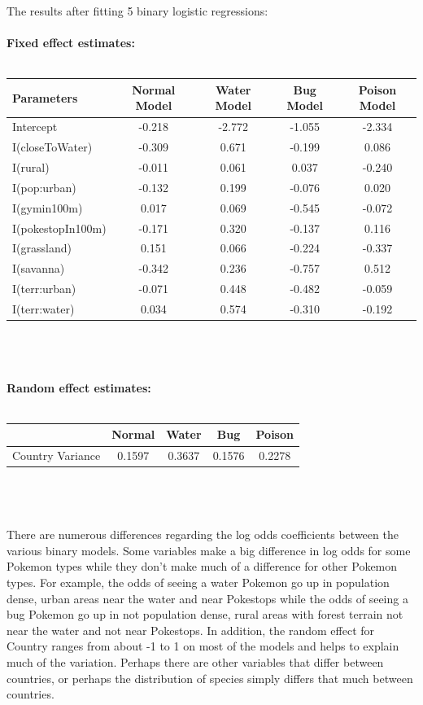 \documentclass{article}
\begin{document}
\noindent The results after fitting 5 binary logistic regressions: \\ 
\\ 
\textbf{Fixed effect estimates:} \\ \\ 
\begin{tabular}{| l | c | c | c | c |}
	\hline
	Parameters & Normal Model & Water Model & Bug Model & Poison Model \\
	\hline 
	Intercept & -0.218 & -2.772 & -1.055 & -2.334 \\ 
	I(closeToWater) & -0.309 & 0.671 & -0.199 & 0.086 \\ 
	I(rural) & -0.011 & 0.061 & 0.037 & -0.240\\ 
	I(pop:urban) & -0.132 & 0.199 & -0.076 & 0.020 \\ 
	I(gymin100m) & 0.017 & 0.069 & -0.545 &  -0.072 \\ 
	I(pokestopIn100m) & -0.171 & 0.320 & -0.137 & 0.116 \\ 
	I(grassland) & 0.151 & 0.066 & -0.224 & -0.337 \\ 
	I(savanna) & -0.342 & 0.236 & -0.757 & 0.512 \\ 
	I(terr:urban) & -0.071 & 0.448 & -0.482 & -0.059  \\ 
	I(terr:water) & 0.034 & 0.574 & -0.310 & -0.192 \\ 
	\hline
\end{tabular} 
\\ 
\\ 
\\ 
\textbf{Random effect estimates:} \\ \\ 
\begin{tabular}{| l | c | c | c | c |}
	\hline
	& Normal & Water & Bug & Poison \\  
	\hline
	Country Variance & 0.1597 & 0.3637 & 0.1576 & 0.2278 \\ 
	\hline
\end{tabular} 
\\ 
\\ 
\\ 
There are numerous differences regarding the log odds coefficients between the various binary models. Some variables make a big difference in log odds for some Pokemon types while they don't make much of a difference for other Pokemon types. For example, the odds of seeing a water Pokemon go up in population dense, urban areas near the water and near Pokestops while the odds of seeing a bug Pokemon go up in not population dense, rural areas with forest terrain not near the water and not near Pokestops. In addition, the random effect for Country ranges from about -1 to 1 on most of the models and helps to explain much of the variation. Perhaps there are other variables that differ between countries, or perhaps the distribution of species simply differs that much between countries. 
\end{document}
